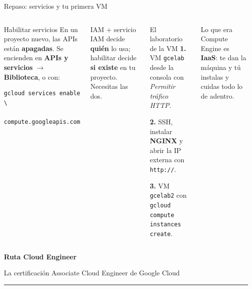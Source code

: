 \documentclass[aspectratio=169,10pt,c]{beamer}
\begin{document}
\begin{frame}[fragile]{Repaso: servicios y tu primera VM}
\begin{columns}[T,onlytextwidth]
\begin{block}{Habilitar servicios}
\small En un proyecto nuevo, las APIs están \textbf{apagadas}. Se encienden en \textbf{APIs y servicios} $\rightarrow$ \textbf{Biblioteca}, o con:
\begin{lstlisting}
gcloud services enable \
  compute.googleapis.com
\end{lstlisting}
\end{block}
\begin{alertblock}{IAM + servicio}
\small IAM decide \textbf{quién} lo usa; habilitar decide \textbf{si existe} en tu proyecto. Necesitas las dos.
\end{alertblock}
\begin{exampleblock}{El laboratorio de la VM}
\small
\textbf{1.} VM \texttt{gcelab} desde la consola con \emph{Permitir tráfico HTTP}.\par\smallskip
\textbf{2.} SSH, instalar \textbf{NGINX} y abrir la IP externa con \texttt{http://}.\par\smallskip
\textbf{3.} VM \texttt{gcelab2} con \texttt{gcloud compute instances create}.
\end{exampleblock}
\begin{block}{Lo que era}
\small Compute Engine es \textbf{IaaS}: te dan la máquina y tú instalas y cuidas todo lo de adentro.
\end{block}
\end{columns}
\end{frame}

\begin{frame}[plain]
\vfill
\begin{center}
{\fontsize{29}{34}\selectfont\bfseries Ruta Cloud Engineer}\par
\vspace{2mm}
{\small La certificación Associate Cloud Engineer de Google Cloud}\par
\vspace{4mm}
{\color{utpRojo}\rule{8.5cm}{1.2pt}}
\end{center}
\vfill
\end{frame}
\end{document}
